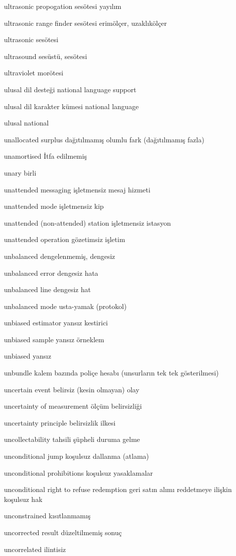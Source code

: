 \documentclass[12pt,fleqn]{article}\usepackage{../../common}
\begin{document}
ultrasonic propogation sesötesi yayılım

ultrasonic range finder sesötesi erimölçer, uzaklıkölçer

ultrasonic sesötesi

ultrasound sesüstü, sesötesi

ultraviolet morötesi

ulusal dil desteği national language support

ulusal dil karakter kümesi national language

ulusal national

unallocated surplus dağıtılmamış olumlu fark (dağıtılmamış fazla)

unamortised İtfa edilmemiş

unary birli

unattended messaging işletmensiz mesaj hizmeti

unattended mode işletmensiz kip

unattended (non-attended) station işletmensiz istasyon

unattended operation gözetimsiz işletim

unbalanced dengelenmemiş, dengesiz

unbalanced error dengesiz hata

unbalanced line dengesiz hat

unbalanced mode usta-yamak (protokol)

unbiased estimator yansız kestirici

unbiased sample yansız örneklem

unbiased yansız

unbundle kalem bazında poliçe hesabı (unsurların tek tek gösterilmesi)

uncertain event belirsiz (kesin olmayan) olay

uncertainty of measurement ölçüm belirsizliği

uncertainty principle belirsizlik ilkesi

uncollectability tahsili şüpheli duruma gelme

unconditional jump koşulsuz dallanma (atlama)

unconditional prohibitions koşulsuz yasaklamalar

unconditional right to refuse redemption geri satın alımı reddetmeye ilişkin koşulsuz hak

unconstrained kısıtlanmamış

uncorrected result düzeltilmemiş sonuç

uncorrelated ilintisiz
\end{document}
